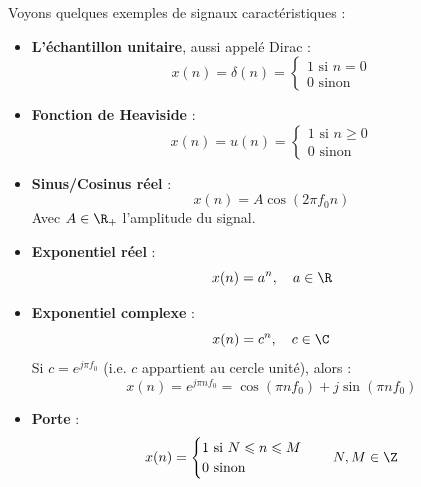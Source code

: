 \begin{example}
    Voyons quelques exemples de signaux caractéristiques : 
    \begin{itemize}
        \item \textbf{L'échantillon unitaire}, aussi appelé Dirac : 
            \begin{equation}
                x(n) = \delta(n) = 
                    \begin{cases}
                        1 \text{ si } n = 0 \\ 
                        0 \text{ sinon } 
                    \end{cases}
            \end{equation}
        \item \textbf{Fonction de Heaviside} : 
            \begin{equation}
                x(n) = u(n) = 
                    \begin{cases}
                        1 \text{ si } n \geqslant 0 \\
                        0 \text{ sinon}  
                    \end{cases}
            \end{equation}
        \item \textbf{Sinus/Cosinus réel} : 
            \begin{equation}
                x(n) = A \cos (2 \pi f_0 n) 
            \end{equation}
            Avec $A \in \R_+$ l'amplitude du signal. 
        \item \textbf{Exponentiel réel} : 
            \begin{equation}
                x(n) = a^n, \quad a \in \R 
            \end{equation}
        \item \textbf{Exponentiel complexe} : 
            \begin{equation}
                x(n) = c^n, \quad c \in \C
            \end{equation}
            Si $c = e^{j \pi f_0}$ (i.e. $c$ appartient au cercle unité), alors : 
                $$ x(n) = e^{j \pi n f_0} = \cos ( \pi n f_0) + j \sin ( \pi n f_0) $$ 
        \item \textbf{Porte} : 
            \begin{equation}
                x(n) = 
                \begin{cases}
                    1 \text{ si } N \leqslant n \leqslant M \\ 
                    0 \text{ sinon }  
                \end{cases}
                \quad N, M \in \Z 
            \end{equation}
    \end{itemize}
\end{example}

